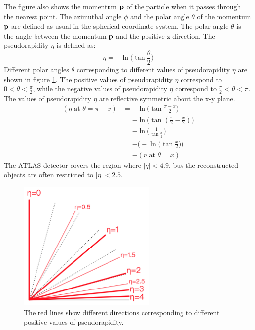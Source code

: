 The figure also shows the momentum $\bf{p}$ of the particle when it passes through the nearest point.
The azimuthal angle $\phi$ and the polar angle $\theta$ of the momentum $\bf{p}$ are defined as usual in the spherical coordinate system.
The polar angle $\theta$ is the angle between the momentum $\bf{p}$ and the positive z-direction.
The pseudorapidity $\eta$ is defined as:
\begin{equation}
\eta = - \ln \Big( \tan \frac{\theta}{2} \Big)
\end{equation}
Different polar angles $\theta$ corresponding to different values of pseudorapidity $\eta$ are shown in figure \ref{fig:pseudorapidity}.
The positive values of pseudorapidity $\eta$ correspond to $0 <\theta< \frac{\pi}{2}$, while the negative values of pseudorapidity $\eta$ correspond to $\frac{\pi}{2} <\theta< \pi$.
The values of pseudorapidity $\eta$ are reflective symmetric about the x-y plane.
\begin{align}
( \eta \text{ at } \theta = \pi - x) &= - \ln \Big( \tan \frac{\pi - x}{2} \Big) \\
&= - \ln \Big( \tan (\frac{\pi}{2} - \frac{x}{2}) \Big) \\
&= - \ln \Big( \frac{1}{ \tan \frac{x}{2} } \Big) \\
&= - \Big( - \ln \Big( \tan \frac{x}{2} \Big) \Big) \\
&= - ( \eta \text{ at } \theta = x)
\end{align}
The ATLAS detector covers the region where $|\eta| < 4.9$, but the reconstructed objects are often restricted to $|\eta| < 2.5$.

\begin{figure}
\centering
\includegraphics[width=0.6\textwidth]{data/photo/detector/pseudorapidity.png}
\caption{The red lines show different directions corresponding to different positive values of pseudorapidity. \cite{pseudorapidity}}
\label{fig:pseudorapidity}
\end{figure}


